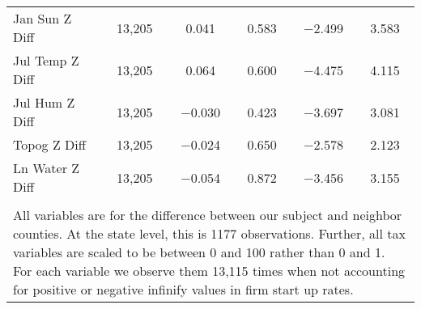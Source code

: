 \begin{table}[!htbp]
\begin{tabular}{@{\extracolsep{5pt}}lccccc}
Jan Sun Z Diff & 13,205 & 0.041 & 0.583 & $-$2.499 & 3.583 \\ 
Jul Temp Z Diff & 13,205 & 0.064 & 0.600 & $-$4.475 & 4.115 \\ 
Jul Hum Z Diff & 13,205 & $-$0.030 & 0.423 & $-$3.697 & 3.081 \\ 
Topog Z Diff & 13,205 & $-$0.024 & 0.650 & $-$2.578 & 2.123 \\ 
Ln Water Z Diff & 13,205 & $-$0.054 & 0.872 & $-$3.456 & 3.155 \\ 
\hline \\[-1.8ex] 
\multicolumn{6}{l}{All variables are for the difference between our subject and neighbor counties. At the state level, this is 1177 observations. Further, all tax variables are scaled to be between 0 and 100 rather than 0 and 1. For each variable we observe them 13,115 times when not accounting for positive or negative infinify values in firm start up rates.} \\ 
\end{tabular} 
\end{table} 
